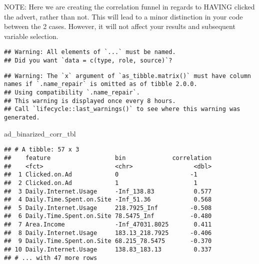 \documentclass[]{article}
\newenvironment{Shaded}{\begin{snugshade}}{\end{snugshade}}
\newcommand{\KeywordTok}[1]{\textcolor[rgb]{0.13,0.29,0.53}{\textbf{#1}}}
\newcommand{\DecValTok}[1]{\textcolor[rgb]{0.00,0.00,0.81}{#1}}
\newcommand{\StringTok}[1]{\textcolor[rgb]{0.31,0.60,0.02}{#1}}
\newcommand{\OperatorTok}[1]{\textcolor[rgb]{0.81,0.36,0.00}{\textbf{#1}}}
\newcommand{\NormalTok}[1]{#1}
\begin{document}
NOTE: Here we are creating the correlation funnel in regards to HAVING
clicked the advert, rather than not. This will lead to a minor
distinction in your code between the 2 cases. However, it will not
affect your results and subsequent variable selection.

\begin{Shaded}
\end{Shaded}

\begin{verbatim}
## Warning: All elements of `...` must be named.
## Did you want `data = c(type, role, source)`?
\end{verbatim}

\begin{Shaded}
\end{Shaded}

\begin{verbatim}
## Warning: The `x` argument of `as_tibble.matrix()` must have column names if `.name_repair` is omitted as of tibble 2.0.0.
## Using compatibility `.name_repair`.
## This warning is displayed once every 8 hours.
## Call `lifecycle::last_warnings()` to see where this warning was generated.
\end{verbatim}

\begin{Shaded}
\begin{Highlighting}[]
\NormalTok{ad_binarized_corr_tbl}
\end{Highlighting}
\end{Shaded}

\begin{verbatim}
## # A tibble: 57 x 3
##    feature                  bin             correlation
##    <fct>                    <chr>                 <dbl>
##  1 Clicked.on.Ad            0                    -1    
##  2 Clicked.on.Ad            1                     1    
##  3 Daily.Internet.Usage     -Inf_138.83           0.577
##  4 Daily.Time.Spent.on.Site -Inf_51.36            0.568
##  5 Daily.Internet.Usage     218.7925_Inf         -0.508
##  6 Daily.Time.Spent.on.Site 78.5475_Inf          -0.480
##  7 Area.Income              -Inf_47031.8025       0.411
##  8 Daily.Internet.Usage     183.13_218.7925      -0.406
##  9 Daily.Time.Spent.on.Site 68.215_78.5475       -0.370
## 10 Daily.Internet.Usage     138.83_183.13         0.337
## # ... with 47 more rows
\end{verbatim}
\end{document}

